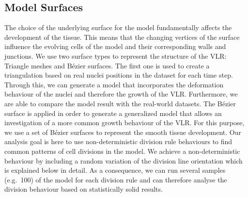 \documentclass[11pt,a4paper, draft]{article}
\begin{document}
\subsection{Model Surfaces}
\noindent
The choice of the underlying surface for the model fundamentally affects the development of the tissue. This means that the changing vertices of the surface influence the evolving cells of the model and their corresponding walls and junctions. We use two surface types to represent the structure of the VLR: Triangle meshes and B\'ezier surfaces. The first one is used to create a triangulation based on real nuclei positions in the dataset for each time step. Through this, we can generate a model that incorporates the deformation behaviour of the nuclei and therefore the growth of the VLR. Furthermore, we are able to compare the model result with the real-world datasets. The B\'ezier surface is applied in order to generate a generalized model that allows an investigation of a more common growth behaviour of the VLR. For this purpose, we use a set of B\'ezier surfaces to represent the smooth tissue development. Our analysis goal is here to use non-deterministic division rule behaviours to find common patterns of cell divisions in the model. We achieve a non-deterministic behaviour by including a random variation of the division line orientation which is explained below in detail. As a consequence, we can run several samples (e.g.~100) of the model for each division rule and can therefore analyse the division behaviour based on statistically solid results.
\end{document}
